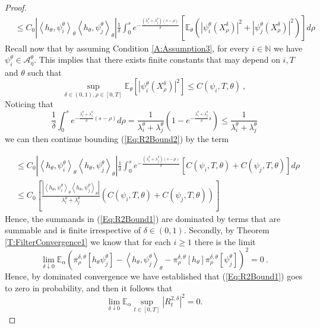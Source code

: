 \documentclass{article}
\begin{document}
\begin{proof}
\begin{align}
&\leq C_{0}\left|\left<h_{\theta},\psi_i^{\theta}\right>_{\theta} \left<h_{\theta},\psi_j^{\theta}\right>_{\theta}\right|  \frac{1}{\delta}\int_0^s e^{-\frac{\left(\lambda_i^{\theta}+\lambda_j^{\theta}\right)(s-\rho)}{\delta}}
\left[\mathbb{E}_{\theta}\left(\left|\psi_i^{\theta}\left(X^{\delta}_{\rho}\right)\right|^{2}+\left|\psi_j^{\theta}\left(X^{\delta}_{\rho}\right)\right|^{2}\right)
\right]
 d\rho \label{Eq:R2Bound2}
\end{align}
Recall now that by assuming Condition \ref{A:Assumption3}, for every $i\in\mathbb{N}$ we have $\psi_i^\theta\in\mathcal{A}_{\eta}^{\theta}$. This implies that there exists finite constants that may depend on $i, T$ and $\theta$ such that
\[
\sup_{\delta\in(0,1),\rho\in[0,T]}\mathbb E_\theta\left[|\psi_i^\theta(X_\rho^\delta)|^2\right]\leq C(\psi_{i},T,\theta)\ ,
\]
Noticing that
\[
\frac{1}{\delta}\int_{0}^{s}e^{-\frac{\lambda_i^{\theta}+\lambda_j^{\theta}}{\delta}(s-\rho)}d\rho=\frac{1}{\lambda_i^{\theta}+\lambda_j^{\theta}}
\left(1-e^{-\frac{\lambda_i^{\theta}+\lambda_j^{\theta}}{\delta}s}\right)\leq \frac{1}{\lambda_i^{\theta}+\lambda_j^{\theta}}
\]
we can then continue bounding (\ref{Eq:R2Bound2}) by the term

\begin{align}
&\leq C_{0}\left|\left<h_{\theta},\psi_i^{\theta}\right>_{\theta} \left<h_{\theta},\psi_j^{\theta}\right>_{\theta}\right|  \frac{1}{\delta}\int_0^s e^{-\frac{\left(\lambda_i^{\theta}+\lambda_j^{\theta}\right)(s-\rho)}{\delta}}
\left[C(\psi_{i},T,\theta)+C(\psi_{j},T,\theta)\right]
 d\rho\nonumber\\
&\leq C_{0}\left[\frac{\left|\left<h_{\theta},\psi_i^{\theta}\right>_{\theta} \left<h_{\theta},\psi_j^{\theta}\right>_{\theta}\right|}{\lambda_i^{\theta}+\lambda_j^{\theta}}
\left(C(\psi_{i},T,\theta)+C(\psi_{j},T,\theta)\right)  \right]
  \label{Eq:R2Bound3}
\end{align}
Hence, the summands in (\ref{Eq:R2Bound1}) are dominated by terms that are summable and is finite irrespective of $\delta\in(0,1)$. Secondly, by Theorem  \ref{T:FilterConvergence1}  we know that for each $i\geq 1$ there is the limit
\[
\lim_{\delta\downarrow 0}\mathbb{E}_{\alpha}\left(\pi_\rho^{\delta,\theta}[h_{\theta}\psi_j^{\theta}]-\left<h_{\theta},\psi_j^{\theta}\right>_{\theta}
-\pi_\rho^{\delta,\theta}[h_{\theta}]\pi_\rho^{\delta,\theta}[\psi_j^{\theta}]
\right)^{2}=0\ .
\]
Hence, by dominated convergence we have established that (\ref{Eq:R2Bound1}) goes to zero in probability, and then it follows that
\begin{equation*}
\lim_{\delta\downarrow 0}\mathbb{E}_{\alpha}\sup_{t\in[0,T]}\left|R^{2,\delta}_{t}\right|^{2}=0.
\end{equation*}

\end{proof}
\end{document}
